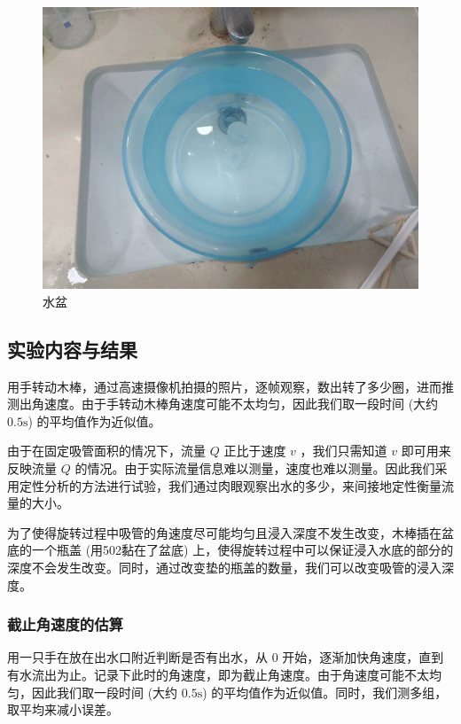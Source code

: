 \documentclass[fontset=windows]{article}
\begin{document}
\begin{figure}[htbp]
    \centering
    \includegraphics[scale=0.15]{9.png}
    \caption{水盆}
    \label{4}
\end{figure}


\subsection{实验内容与结果}

用手转动木棒，通过高速摄像机拍摄的照片，逐帧观察，数出转了多少圈，进而推测出角速度。由于手转动木棒角速度可能不太均匀，因此我们取一段时间 (大约 $0.5\text{s}$) 的平均值作为近似值。

由于在固定吸管面积的情况下，流量 $Q$ 正比于速度 $v$ ，我们只需知道 $v$ 即可用来反映流量 $Q$ 的情况。由于实际流量信息难以测量，速度也难以测量。因此我们采用定性分析的方法进行试验，我们通过肉眼观察出水的多少，来间接地定性衡量流量的大小。

为了使得旋转过程中吸管的角速度尽可能均匀且浸入深度不发生改变，木棒插在盆底的一个瓶盖 (用502黏在了盆底) 上，使得旋转过程中可以保证浸入水底的部分的深度不会发生改变。同时，通过改变垫的瓶盖的数量，我们可以改变吸管的浸入深度。


\subsubsection{截止角速度的估算}

用一只手在放在出水口附近判断是否有出水，从 $0$ 开始，逐渐加快角速度，直到有水流出为止。记录下此时的角速度，即为截止角速度。由于角速度可能不太均匀，因此我们取一段时间 (大约 $0.5\text{s}$) 的平均值作为近似值。同时，我们测多组，取平均来减小误差。
\end{document}
